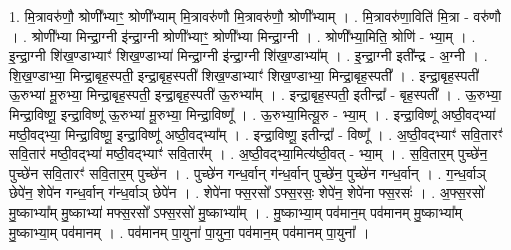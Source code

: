\documentclass[17pt]{extarticle}
\begin{document}
1. मि॒त्रावरु॑णौ॒ श्रोणी᳚भ्याꣳ॒॒ श्रोणी᳚भ्याम् मि॒त्रावरु॑णौ मि॒त्रावरु॑णौ॒ श्रोणी᳚भ्याम् । . मि॒त्रावरु॑णा॒विति॑ मि॒त्रा - वरु॑णौ । . श्रोणी᳚भ्या मिन्द्रा॒ग्नी इ॑न्द्रा॒ग्नी श्रोणी᳚भ्याꣳ॒॒ श्रोणी᳚भ्या मिन्द्रा॒ग्नी । . श्रोणी᳚भ्या॒मिति॒ श्रोणि॑ - भ्या॒म् । . इ॒न्द्रा॒ग्नी शि॑ख॒ण्डाभ्याꣳ॑ शिख॒ण्डाभ्या॑ मिन्द्रा॒ग्नी इ॑न्द्रा॒ग्नी शि॑ख॒ण्डाभ्या᳚म् । . इ॒न्द्रा॒ग्नी इती᳚न्द्र - अ॒ग्नी । . शि॒ख॒ण्डाभ्या॒ मिन्द्रा॒बृह॒स्पती॒ इन्द्रा॒बृह॒स्पती॑ शिख॒ण्डाभ्याꣳ॑ शिख॒ण्डाभ्या॒ मिन्द्रा॒बृह॒स्पती᳚ । . इन्द्रा॒बृह॒स्पती॑ ऊ॒रुभ्या॑ मू॒रुभ्या॒ मिन्द्रा॒बृह॒स्पती॒ इन्द्रा॒बृह॒स्पती॑ ऊ॒रुभ्या᳚म् । . इन्द्रा॒बृह॒स्पती॒ इतीन्द्रा᳚ - बृह॒स्पती᳚ । . ऊ॒रुभ्या॒ मिन्द्रा॒विष्णू॒ इन्द्रा॒विष्णू॑ ऊ॒रुभ्या॑ मू॒रुभ्या॒ मिन्द्रा॒विष्णू᳚ । . ऊ॒रुभ्या॒मित्यू॒रु - भ्या॒म् । . इन्द्रा॒विष्णू॑ अष्ठी॒वद्भ्या॑ मष्ठी॒वद्भ्या॒ मिन्द्रा॒विष्णू॒ इन्द्रा॒विष्णू॑ अष्ठी॒वद्भ्या᳚म् । . इन्द्रा॒विष्णू॒ इतीन्द्रा᳚ - विष्णू᳚ । . अ॒ष्ठी॒वद्भ्याꣳ॑ सवि॒तारꣳ॑ सवि॒तार॑ मष्ठी॒वद्भ्या॑ मष्ठी॒वद्भ्याꣳ॑ सवि॒तार᳚म् । . अ॒ष्ठी॒वद्भ्या॒मित्य॑ष्ठी॒वत् - भ्या॒म् । . स॒वि॒तार॒म् पुच्छे॑न॒ पुच्छे॑न सवि॒तारꣳ॑ सवि॒तार॒म् पुच्छे॑न । . पुच्छे॑न गन्ध॒र्वान् ग॑न्ध॒र्वान् पुच्छे॑न॒ पुच्छे॑न गन्ध॒र्वान् । . ग॒न्ध॒र्वाञ् छेपे॑न॒ शेपे॑न गन्ध॒र्वान् ग॑न्ध॒र्वाञ् छेपे॑न । . शेपे॑ना फ्स॒रसो᳚ ऽफ्स॒रसः॒ शेपे॑न॒ शेपे॑ना फ्स॒रसः॑ । . अ॒फ्स॒रसो॑ मु॒ष्काभ्या᳚म् मु॒ष्काभ्या॑ मफ्स॒रसो᳚ ऽफ्स॒रसो॑ मु॒ष्काभ्या᳚म् । . मु॒ष्काभ्या॒म् पव॑मान॒म् पव॑मानम् मु॒ष्काभ्या᳚म् मु॒ष्काभ्या॒म् पव॑मानम् । . पव॑मानम् पा॒युना॑ पा॒युना॒ पव॑मान॒म् पव॑मानम् पा॒युना᳚ । \newline
\end{document}
